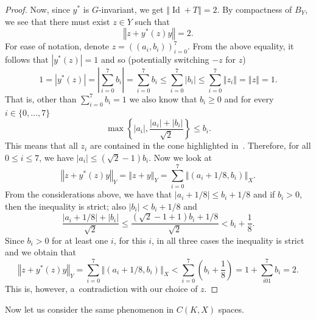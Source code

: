 \documentclass[a4paper,12pt]{amsart}
\theoremstyle{definition}
\theoremstyle{definition}
\theoremstyle{remark}
\numberwithin{equation}{section}
\DeclareMathOperator{\id}{Id}
\newcommand{\<}{\langle}
\renewcommand{\>}{\rangle}
\newcommand{\norm}[1]{\left\Vert#1\right\Vert}
\newcommand{\abs}[1]{\left\vert#1\right\vert}
\begin{document}
\begin{proof}
		Now, since $y^*$ is $G$-invariant, we get $\norm{\id + T} = 2$. By compactness of $B_Y$, we see that there must exist $z \in Y$ such that 
		\begin{equation*}
			\norm{z + y^*(z)y} = 2.
		\end{equation*}
		For ease of notation, denote $z = ((a_i, b_i))_{i=0}^7$. From the above equality, it follows that $|y^*(z)|=1$ and so (potentially switching $-z$ for $z$)
		\begin{equation*}
			1 = \abs{y^*(z)} = \abs{\sum_{i=0}^7 b_i} = \sum_{i=0}^7 b_i
			\le \sum_{i=0}^7 \abs{b_i} \le \sum_{i=0}^7 \norm{z_i} = \norm{z} = 1.
		\end{equation*}
		That is, other than $\sum_{i=0}^7 b_i = 1$ we also know that $b_i \ge 0$ and for every $i \in \{0, \dots, 7\}$
		\begin{equation*}
			\max \left\{ \abs{a_i}, \frac{\abs{a_i} + \abs{b_i}}{\sqrt{2}} \right\} \le b_i.
		\end{equation*}
		This means that all $z_i$ are contained in the cone highlighted in~. Therefore, for all $0 \le i \le 7$, we have $\abs{a_i} \le (\sqrt{2}-1)b_i$. Now we look at
		\begin{equation*}
			\norm{z + y^*(z)y}_Y
			= \norm{z + y}_Y
			= \sum_{i=0}^7 \norm{(a_i + 1/8, b_i)}_X.
		\end{equation*}
		From the considerations above, we have that $\abs{a_i + 1/8} \le b_i + 1/8$ and if $b_i > 0$, then the inequality is strict; also $\abs{b_i} < b_i + 1/8$ and 
		\begin{equation*}
			\frac{\abs{a_i + 1/8} + \abs{b_i}}{\sqrt{2}}
			\le \frac{(\sqrt{2}-1+1)b_i + 1/8}{\sqrt{2}}
			< b_i + \frac{1}{8}.
		\end{equation*}
		Since $b_i > 0$ for at least one $i$, for this $i$, in all three cases the inequality is strict and we obtain that
		\begin{equation*}
			\norm{z + y^*(z)y}_Y
			= \sum_{i=0}^7 \norm{(a_i + 1/8, b_i)}_X
			< \sum_{i=0}^7 \left( b_i + \frac{1}{8} \right)
			= 1 + \sum_{i01}^7 b_i
			= 2.
		\end{equation*}
		This is, however, a~contradiction with our choice of $z$.
	\end{proof}
	
	Now let us consider the same phenomenon in $C(K,X)$ spaces.
	
\end{document}
